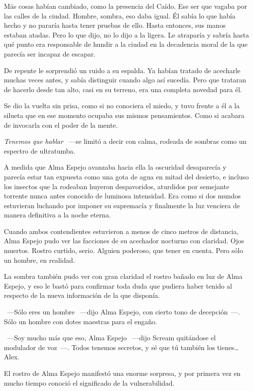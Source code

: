 Más cosas habían cambiado, como la presencia del Caído. Ese ser que vagaba por las calles de la ciudad. Hombre, sombra, eso daba igual. Él sabía lo que había hecho y no pararía hasta tener pruebas de ello. Hasta entonces, sus manos estaban atadas. Pero lo que dijo, no lo dijo a la ligera. Le atraparía y sabría hasta qué punto era responsable de hundir a la ciudad en la decadencia moral de la que parecía ser incapaz de escapar.

De repente le sorprendió un ruido a su espalda. Ya habían tratado de acecharle muchas veces antes, y sabía distinguir cuando algo así sucedía. Pero que trataran de hacerlo desde tan alto, casi en su terreno, era una completa novedad para él.

Se dio la vuelta sin prisa, como si no conociera el miedo, y tuvo frente a él a la silueta que en ese momento ocupaba sus mismos pensamientos. Como si acabara de invocarla con el poder de la mente.

\emph{Tenemos que hablar} ~---se limitó a decir con calma, rodeada de sombras como un espectro de ultratumba.

A medida que Alma Espejo avanzaba hacia ella la oscuridad desaparecía y parecía estar tan expuesta como una gota de agua en mitad del desierto, e incluso los insectos que la rodeaban huyeron despavoridos, aturdidos por semejante torrente nunca antes conocido de luminosa intensidad. Era como si dos mundos estuvieran luchando por imponer su supremacía y finalmente la luz venciera de manera definitiva a la noche eterna.

Cuando ambos contendientes estuvieron a menos de cinco metros de distancia, Alma Espejo pudo ver las facciones de su acechador nocturno con claridad. Ojos muertos. Rostro curtido, serio. Alguien poderoso, que tener en cuenta. Pero sólo un hombre, en realidad.

La sombra también pudo ver con gran claridad el rostro bañado en luz de Alma Espejo, y eso le bastó para confirmar toda duda que pudiera haber tenido al respecto de la nueva información de la que disponía.

~---Sólo eres un hombre ~---dijo Alma Espejo, con cierto tono de decepción~---. Sólo un hombre con dotes maestras para el engaño.

~---Soy mucho más que eso, Alma Espejo ~---dijo Scream quitándose el modulador de voz~---. Todos tenemos secretos, y sé que tú también los tienes… Alex.

El rostro de Alma Espejo manifestó una enorme sorpresa, y por primera vez en mucho tiempo conoció el significado de la vulnerabilidad.

